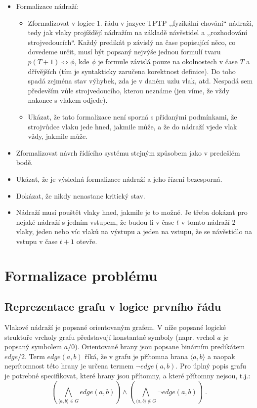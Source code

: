 \documentclass[a4paper,journal]{IEEEtran}
\begin{document}
\begin{itemize}
	\item Formalizace nádraží:
	\begin{itemize}
		\item Zformalizovat v logice 1. řádu v jazyce TPTP ,,fyzikální chování`` nádraží, 
		tedy jak vlaky projíždějí nádražím na základě návěstidel a ,,rozhodování strojvedoucích``. 
		Každý predikát p závislý na čase popisující něco, co dovedeme určit, musí být popsaný nejvýše 
		jednou formulí tvaru $p(T+1) \Leftrightarrow \phi$, kde $\phi$ je formule závislá pouze 
		na okolnostech v čase $T$ a dřívějších (tím je syntakticky zaručena korektnost definice).
		Do toho spadá zejména stav výhybek, zda je v daném uzlu vlak, atd. 
		Nespadá sem především vůle strojvedoucího, kterou neznáme
		(jen víme, že vždy nakonec s vlakem odjede).
		\item Ukázat, že tato formalizace není sporná s přidanými podmínkami, že strojvůdce vlaku jede hned,
		jakmile může, a že do nádraží vjede vlak vždy, jakmile může.
	\end{itemize}
	\item Zformalizovat návrh řídícího systému stejným způsobem jako v predešlém bodě.
	\item Ukázat, že je výsledná formalizace nádraží a jeho řízení bezesporná.
	\item Dokázat, že nikdy nenastane kritický stav.
	\item Nádraží musí pouštět vlaky hned, jakmile je to možné. 
	Je třeba dokázat pro nejaké nádraží s jedním vstupem, že budou-li v čase $t$ v tomto nádraží 2 vlaky, 
	jeden nebo víc vlaků na výstupu a jeden na vstupu, že se návěstidlo na vstupu v čase $t+1$ otevře.
\end{itemize}


\section{Formalizace problému}\label{sec:formal}
\subsection{Reprezentace grafu v logice prvního řádu}
Vlakové nádraží je popsané orientovaným grafem. V níže popsané logické struktuře vrcholy grafu
představují konstantné symboly (napr. vrchol $a$ je popsaný symbolem $a/0$).
Orientované hrany jsou popsane binárním predikátem $edge/2$. Term $edge(a,b)$ říká, že v grafu je přítomna 
hrana $\langle a,b\rangle$ a naopak neprítomnost této hrany je určena termem $\neg edge(a,b)$.
Pro úplný popis grafu je potrebné specifikovat, které hrany jsou přítomny, a které přítomny nejsou,
t.j.:
\begin{equation}
( \bigwedge_{\langle a,b\rangle\in G}{edge(a,b)} ) \wedge 
( \bigwedge_{\langle a,b\rangle\not\in G}{\neg edge(a,b)} )\;.
\end{equation}
\end{document}
